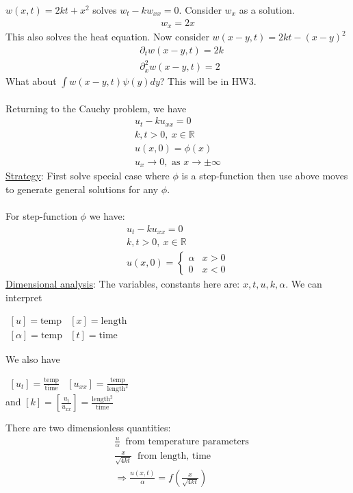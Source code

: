 \documentclass[12pt, letterpaper]{article}
\begin{document}
 $w(x,t) = 2kt + x^2$ solves $w_t - kw_{xx} = 0$. Consider $w_x$ as a solution.
\begin{align*}
    w_x = 2x
\end{align*}
This also solves the heat equation. Now consider $w(x-y,t) = 2kt - (x-y)^2$
\begin{align*}
    &\partial_t w(x-y,t) = 2k \\
    &\partial_{x}^2 w(x-y,t) = 2
\end{align*}
What about $\int w(x-y,t) \psi(y)dy$? This will be in HW3. \\ \\ 
Returning to the Cauchy problem, we have 
\begin{align*}
    u_t - ku_{xx} = 0 \\
    k,t > 0,\ x \in \mathbb{R} \\
    u(x,0) = \phi(x) \\
    u_x \rightarrow 0, \text{ as } x \rightarrow \pm \infty
\end{align*}
\underline{Strategy}: First solve special case where $\phi$ is a step-function then use above
moves to generate general solutions for any $\phi$. \\ \\
For step-function $\phi$ we have:
\begin{align*}
    u_t - ku_{xx} = 0 \\
    k,t > 0,\ x \in \mathbb{R} \\
    u(x,0) = \begin{cases}
        \alpha & x > 0 \\
        0 & x < 0
    \end{cases}
\end{align*}
\underline{Dimensional analysis}: The variables, constants here are: $x,t,u,k,\alpha$. We
can interpret 
\begin{center}
    $\begin{matrix}
    [u] = \text{temp} & [x] = \text{length} \\
    [\alpha] = \text{temp} & [t] = \text{time}
\end{matrix}$
\end{center}
We also have 
\begin{center}
    $\begin{matrix}
        [u_t] = \displaystyle\frac{\text{temp}}{\text{time}} & [u_{xx}] = \displaystyle\frac{\text{temp}}{\text{length}^2}
    \end{matrix}$
    \\ and $[k] = [\displaystyle\frac{u_t}{u_{xx}}] = \frac{\text{length}^2}{\text{time}}$
\end{center}
There are two dimensionless quantities:
\begin{align*}
    &\frac{u}{\alpha}\ \text{ from temperature parameters} \\
    &\frac{x}{\sqrt{4kt}}\ \text{ from length, time} \\
    &\Rightarrow \frac{u(x,t)}{\alpha} = f\left(\frac{x}{\sqrt{4kt}}\right) 
\end{align*}
\end{document}
